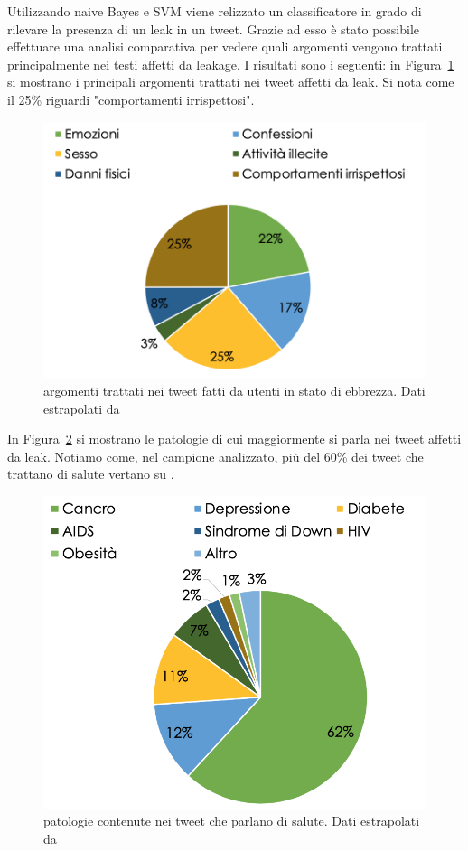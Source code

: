Utilizzando naive Bayes e SVM viene relizzato un classificatore in grado di rilevare la presenza di un leak in un tweet. Grazie ad esso è stato possibile effettuare una analisi comparativa per vedere quali argomenti vengono trattati principalmente nei testi affetti da leakage. I risultati sono i seguenti: in Figura~\ref{fig:res-ebbrezza} si mostrano i principali argomenti trattati nei tweet affetti da leak. Si nota come il 25\% riguardi "comportamenti irrispettosi".
\begin{figure}[h!t]
    \centering
    \includegraphics[width=15cm]{Figure/related_work/ebbrezza.png}
    \caption{argomenti trattati nei tweet fatti da utenti in stato di ebbrezza. Dati estrapolati da\cite{looseTweets}}
    \label{fig:res-ebbrezza}
\end{figure}
\FloatBarrier

In Figura~\ref{fig:res-patologie} si mostrano le patologie di cui maggiormente si parla nei tweet affetti da leak. Notiamo come, nel campione analizzato, più del 60\% dei tweet che trattano di salute vertano su .

\begin{figure}[h!t]
    \centering
    \includegraphics[width=15cm]{Figure/related_work/patologie.png}
    \caption{patologie contenute nei tweet che parlano di salute. Dati estrapolati da\cite{looseTweets}}
    \label{fig:res-patologie}
\end{figure}
\FloatBarrier

